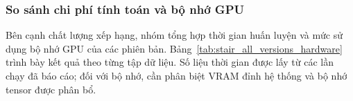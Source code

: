 
\subsubsection{So sánh chi phí tính toán và bộ nhớ GPU}

Bên cạnh chất lượng xếp hạng, nhóm tổng hợp thời gian huấn luyện và mức sử dụng bộ nhớ GPU của các phiên bản. Bảng~\ref{tab:stair_all_versions_hardware} trình bày kết quả theo từng tập dữ liệu. Số liệu thời gian được lấy từ các lần chạy đã báo cáo; đối với bộ nhớ, cần phân biệt VRAM đỉnh hệ thống và bộ nhớ tensor được phân bổ.

\begingroup
\scriptsize
\renewcommand{\arraystretch}{1.13}
\setlength{\tabcolsep}{4pt}
\setlength{\LTleft}{\fill}
\setlength{\LTright}{\fill}

